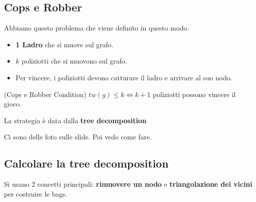 \subsection{Cops e Robber}
Abbiamo questo problema che viene definito in questo modo.

\begin{itemize}
    \item \textbf{1 Ladro} che si muove sul grafo.
    \item $k$ poliziotti che si muovono sul grafo.
    \item Per vincere, i poliziotti devono catturare il ladro e arrivare al suo nodo.
\end{itemize}

\begin{theorem}(Cops e Robber Condition)
    $tw(g) \leq k \iff k+1$ poliziotti possono vincere il gioco.

    La strategia è data dalla \textbf{tree decomposition}
\end{theorem}

Ci sono delle foto sulle slide. Poi vedo come fare.

\subsection{Calcolare la tree decomposition}

Si usano 2 concetti principali: \textbf{rimuovere un nodo} e
\textbf{triangolazione dei vicini} per costruire le bags.


